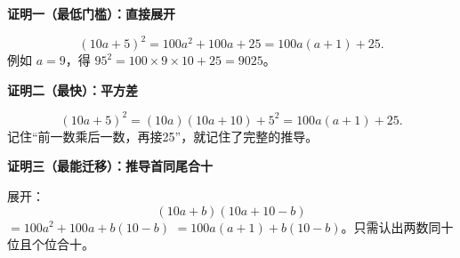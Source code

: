 \clearpage
\begin{proofbox}
\textbf{\textcolor{CProof}{证明一（最低门槛）：直接展开}}
\par\medskip
\begin{center}

\end{center}
\medskip
\[(10a+5)^2=100a^2+100a+25=100a(a+1)+25.\]例如 $a=9$，得 $95^2=100\times9\times10+25=9025$。
\end{proofbox}
\clearpage
\begin{proofbox}
\textbf{\textcolor{CProof}{证明二（最快）：平方差}}
\par\medskip
\begin{center}

\end{center}
\medskip
\[(10a+5)^2=(10a)(10a+10)+5^2=100a(a+1)+25.\]记住“前一数乘后一数，再接25”，就记住了完整的推导。
\end{proofbox}
\clearpage
\begin{proofbox}
\textbf{\textcolor{CProof}{证明三（最能迁移）：推导首同尾合十}}
\par\medskip
\begin{center}

\end{center}
\medskip
展开：\[(10a+b)(10a+10-b)\]$=100a^2+100a+b(10-b)$ $=100a(a+1)+b(10-b)$。只需认出两数同十位且个位合十。
\end{proofbox}
